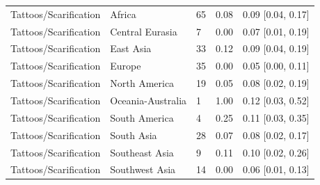 \begin{longtable}{lllll}
Tattoos/Scarification & Africa & 65 & 0.08 & 0.09 [0.04, 0.17] \\
Tattoos/Scarification & Central Eurasia & 7 & 0.00 & 0.07 [0.01, 0.19] \\
Tattoos/Scarification & East Asia & 33 & 0.12 & 0.09 [0.04, 0.19] \\
Tattoos/Scarification & Europe & 35 & 0.00 & 0.05 [0.00, 0.11] \\
Tattoos/Scarification & North America & 19 & 0.05 & 0.08 [0.02, 0.19] \\
Tattoos/Scarification & Oceania-Australia & 1 & 1.00 & 0.12 [0.03, 0.52] \\
Tattoos/Scarification & South America & 4 & 0.25 & 0.11 [0.03, 0.35] \\
Tattoos/Scarification & South Asia & 28 & 0.07 & 0.08 [0.02, 0.17] \\
Tattoos/Scarification & Southeast Asia & 9 & 0.11 & 0.10 [0.02, 0.26] \\
Tattoos/Scarification & Southwest Asia & 14 & 0.00 & 0.06 [0.01, 0.13] \\
\end{longtable}